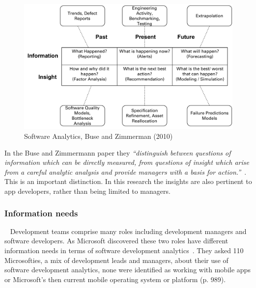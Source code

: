 \begin{figure}
    \centering
    \includegraphics[width=\linewidth]{images/related-work/buse_and_zimmermann_2010_figure_a.pdf}
    \caption{Software Analytics, Buse and Zimmerman (2010)}
    \label{fig:software_analytics_buse_and_zimmerman_2010}
\end{figure}


In the Buse and Zimmermann paper they \emph{``distinguish between questions of information which can be directly measured, from questions of insight which arise from a careful analytic analysis and provide managers with a basis for action.''}~. This is an important distinction. In this research the insights  are also pertinent to app developers, rather than being limited to managers.

\subsubsection{Information needs}~\label{rw-information-needs-research}
Development teams comprise many roles including development managers and software developers. As Microsoft discovered these two roles have different information needs in terms of software development analytics~. They asked 110 Microsofties, a mix of development leads and managers, about their use of software development analytics, none were identified as working with mobile apps or Microsoft's then current mobile operating system or platform (p. 989). 

